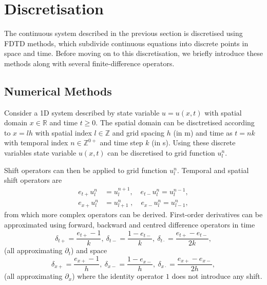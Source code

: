 \section{Discretisation}\label{sec:discrete}
The continuous system described in the previous section is discretised using FDTD methods, which subdivide continuous equations into discrete points in space and time. Before moving on to this discretisation, we briefly introduce these methods along with several finite-difference operators.

\subsection{Numerical Methods}\label{sec:numMeth}
Consider a 1D system described by state variable $u = u(x,t)$ with spatial domain $x\in \mathbb{R}$ and time $t\geq 0$. The spatial domain can be disctretised according to $x=lh$ with spatial index $l \in \mathbb{Z}$ and grid spacing $h$ (in m) and time as $t=nk$ with temporal index $n \in \mathbb{Z}^{0+}$ and time step $k$ (in s). Using these discrete variables state variable $u(x,t)$ can be discretised to grid function $u_l^n$. 

Shift operators can then be applied to grid function $u_l^n$. Temporal and spatial shift operators are
\begin{equation}
    \begin{aligned}
        e_{t+}u_l^n &= u_l^{n+1}, \quad e_{t-}u_l^n = u_l^{n-1},\\
        e_{x+}u_l^n &= u_{l+1}^n\;, \quad \!e_{x-}u_l^n = u_{l-1}^n,
    \end{aligned}
\end{equation}
from which more complex operators can be derived.
First-order derivatives can be approximated using forward, backward and centred difference operators in time
\begin{equation}\label{eq:discTimeOperators}
    \delta_{t+} = \frac{e_{t+} - 1}{k},\ \delta_{t-} = \frac{1 - e_{t-}}{k},\ \delta_{t\cdot} = \frac{e_{t+}-e_{t-}}{2k},
\end{equation}
(all approximating $\partial_t$) and space
\begin{equation}\label{eq:discSpaceOperators}
    \delta_{x+} = \frac{e_{x+} - 1}{h},\ \delta_{x-} = \frac{1 - e_{x-}}{h},\ \delta_{x\cdot} = \frac{e_{x+}-e_{x-}}{2h},
\end{equation} 
(all approximating $\partial_x$) where the identity operator $1$ does not introduce any shift.

